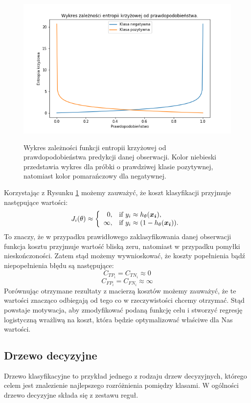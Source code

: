 \documentclass{book}
\begin{document}
	\begin{figure}[h]
		\includegraphics[width=\linewidth]{images/cross_entropy.png}
		\label{cross-entropy-plot}
		\caption{Wykres zależności funkcji entropii krzyżowej od prawdopodobieństwa predykcji danej obserwacji. Kolor niebieski przedstawia wykres dla próbki o prawdziwej klasie pozytywnej, natomiast kolor pomarańczowy dla negatywnej.}
	\end{figure}
	
    Korzystając z Rysunku \ref{cross-entropy-plot} możemy zauważyć, że koszt klasyfikacji przyjmuje następujące wartości:
	$$
	J_i(\theta) \approx \left\{
	\begin{array}{rl}
	0, &\mbox{if $y_i \approx h_{\theta}(\boldsymbol{x_i})$}, \\
	\infty, &\mbox{if $y_i \approx (1 - h_{\theta}(\boldsymbol{x_i}))$}.
	\end{array}{}
	\right.
	$$
	To znaczy, że w przypadku prawidłowego zaklasyfikowania danej obserwacji funkcja kosztu przyjmuje wartość bliską zeru, natomiast w przypadku pomyłki nieskończoności. Zatem stąd możemy wywnioskować, że koszty popełnienia bądź niepopełnienia błędu są następujące:
	$$ C_{TP_i} = C_{TN_i} \approx 0 $$
	$$ C_{FP_i} = C_{FN_i} \approx \infty $$
	Porównując otrzymane rezultaty z macierzą kosztów możemy zauważyć, że te wartości znacząco odbiegają od tego co w rzeczywistości chcemy otrzymać. Stąd powstaje motywacja, aby zmodyfikować podaną funkcję celu i stworzyć regresję logistyczną wrażliwą na koszt, która będzie optymalizować właściwe dla Nas wartości.
\subsection{Drzewo decyzyjne}
\label{drzewo}

	Drzewo klasyfikacyjne to przykład jednego z rodzaju drzew decyzyjnych, którego celem jest znalezienie najlepszego rozróżnienia pomiędzy klasami. W ogólności drzewo decyzyjne składa się z zestawu reguł.
	
\end{document}
